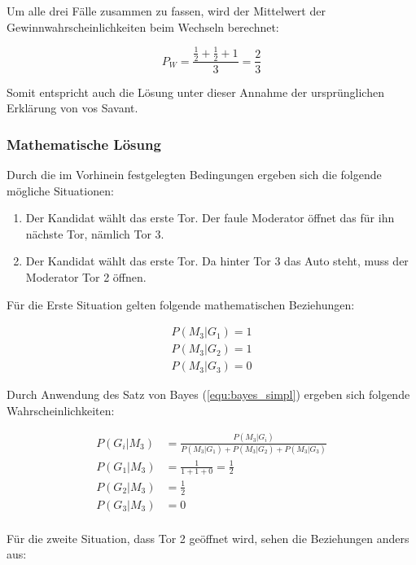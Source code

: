Um alle drei Fälle zusammen zu fassen, wird der Mittelwert der Gewinnwahrscheinlichkeiten beim Wechseln berechnet:

\begin{equation}
    \label{equ:mittelwert_faul}
    P_W = \frac{\frac{1}{2} + \frac{1}{2} + 1}{3} = \frac{2}{3}
\end{equation}

Somit entspricht auch die Lösung unter dieser Annahme der ursprünglichen Erklärung von vos Savant.

\subsubsection{Mathematische Lösung}

Durch die im Vorhinein festgelegten Bedingungen ergeben sich die folgende mögliche Situationen:
\begin{enumerate}
    \item Der Kandidat wählt das erste Tor. Der faule Moderator öffnet das für ihn nächste Tor, nämlich Tor 3.
    \item Der Kandidat wählt das erste Tor. Da hinter Tor 3 das Auto steht, muss der Moderator Tor 2 öffnen.
\end{enumerate}

Für die Erste Situation gelten folgende mathematischen Beziehungen:

\begin{align*}
    P(M_3 | G_1) = 1 \\
    P(M_3 | G_2) = 1 \\
    P(M_3 | G_3) = 0
\end{align*}

Durch Anwendung des Satz von Bayes (\autoref{equ:bayes_simpl}) ergeben sich folgende Wahrscheinlichkeiten:

\begin{align*}
    P(G_i | M_3) & = \frac{P(M_3 | G_i)}{P(M_3 | G_1) + P(M_3 | G_2) + P(M_3 | G_3)} \\
    P(G_1 | M_3) & = \frac{1}{1+1+0} = \frac{1}{2}                                   \\
    P(G_2 | M_3) & = \frac{1}{2}                                                     \\
    P(G_3 | M_3) & = 0                                                               \\
\end{align*}

Für die zweite Situation, dass Tor 2 geöffnet wird, sehen die Beziehungen anders aus:

